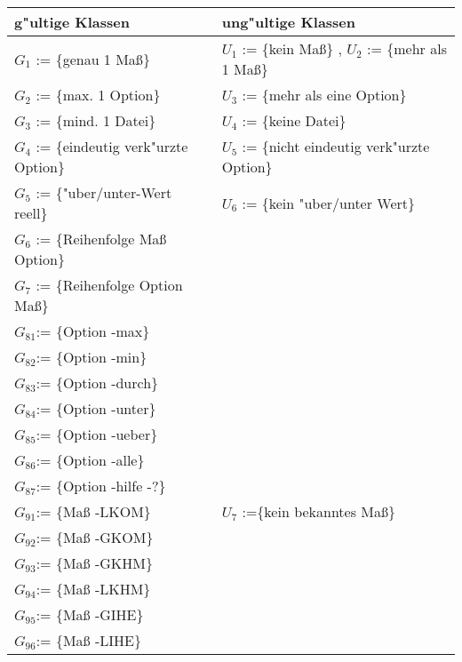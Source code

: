 \begin{tabular}{l|l}
g"ultige Klassen         		& ung"ultige Klassen \\ \hline
$G_1$ := \{genau 1 Ma{\ss}\}  		& $U_1$ := \{kein Ma{\ss}\} , $U_2$ := \{mehr als 1 Ma{\ss}\} \\
$G_2$ := \{max. 1 Option\}              & $U_3$ := \{mehr als eine Option\} \\
$G_3$ := \{mind. 1 Datei\}              & $U_4$ := \{keine Datei\} \\
$G_4$ := \{eindeutig verk"urzte Option\}& $U_5$ := \{nicht eindeutig verk"urzte Option\} \\
$G_5$ := \{"uber/unter-Wert reell\}     & $U_6$ := \{kein "uber/unter Wert\}  \\
$G_6$ := \{Reihenfolge Ma{\ss} Option\}    &                                     \\
$G_7$ := \{Reihenfolge Option Ma{\ss}\}    &                                     \\
$G_{81}$:= \{Option -max\}              &                                   \\
$G_{82}$:= \{Option -min\}              &                                   \\
$G_{83}$:= \{Option -durch\}            &                                   \\
$G_{84}$:= \{Option -unter\}            &                                   \\
$G_{85}$:= \{Option -ueber\}            &                                   \\
$G_{86}$:= \{Option -alle\}             &                                   \\
$G_{87}$:= \{Option -hilfe -?\}         &                                   \\
$G_{91}$:= \{Ma{\ss} -LKOM\}               & $U_7$ :=\{kein bekanntes Ma{\ss}\}   \\
$G_{92}$:= \{Ma{\ss} -GKOM\}               &                                   \\
$G_{93}$:= \{Ma{\ss} -GKHM\}               &                                   \\
$G_{94}$:= \{Ma{\ss} -LKHM\}               &                                   \\
$G_{95}$:= \{Ma{\ss} -GIHE\}               &                                   \\
$G_{96}$:= \{Ma{\ss} -LIHE\}               &                                   \\
\end{tabular}

